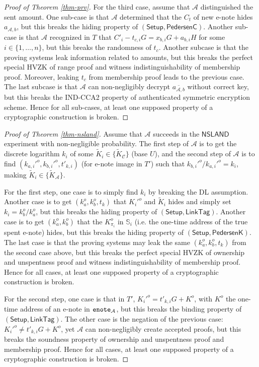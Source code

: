 \documentclass{article}
\begin{document}
\begin{proof}[Proof of Theorem \ref{thm-prv}]
For the third case, assume that $\mathcal{A}$ distinguished the sent amount. One sub-case is that $\mathcal{A}$ determined that the $C_t$ of new e-note hides $a_{\mathcal{A}, b}$, but this breaks the hiding property of $(\textsf{Setup}, \textsf{PedersenC})$. Another sub-case is that $\mathcal{A}$ recognized in $T$ that $C'_i - t_{c, i}G = x_{b,i}G + a_{b,i}H$ for some $i \in \{1, \ldots, n\}$, but this breaks the randomness of $t_c$. Another subcase is that the proving systems leak information related to amounts, but this breaks the perfect special HVZK of range proof and witness indistinguishability of membership proof. Moreover, leaking $t_c$ from membership proof leads to the previous case. The last subcase is that $\mathcal{A}$ can non-negligibly decrypt $\overline{a_{\mathcal{A},b}}$ without correct key, but this breaks the IND-CCA2 property of authenticated symmetric encryption scheme. Hence for all sub-cases, at least one supposed property of a cryptographic construction is broken.
\end{proof}
\begin{proof}[Proof of Theorem \ref{thm-nsland}]
Assume that $\mathcal{A}$ succeeds in the $\textsf{NSLAND}$ experiment with non-negligible probability. The first step of $\mathcal{A}$ is to get the discrete logarithm $k_i$ of some $\tilde{K}_i \in \{\tilde{K}_{\mathcal{C}}\}$ (base $U$), and the second step of $\mathcal{A}$ is to find $(k_{a,i}'^o, k_{b,i}'^o, t'_{k,i})$ (for e-note image in $T'$) such that $k_{b,i}'^o/k_{a,i}'^o = k_i$, making $\tilde{K}_i \in \{\tilde{K}_{\mathcal{A}}\}$.

For the first step, one case is to simply find $k_i$ by breaking the DL assumption. Another case is to get $(k_a^o, k_b^o, t_k)$ that $K_i'^o$ and $\tilde{K}_i$ hides and simply set $k_i = k_b^o / k_a^o$, but this breaks the hiding property of $(\textsf{Setup}, \textsf{LinkTag})$. Another case is to get $(k_a^o, k_b^o)$ that the $K_{\pi_i}^o$ in $\mathbb{S}_i$ (i.e. the one-time address of the true spent e-note) hides, but this breaks the hiding property of $(\textsf{Setup}, \textsf{PedersenK})$. The last case is that the proving systems may leak the same $(k_a^o, k_b^o, t_k)$ from the second case above, but this breaks the perfect special HVZK of ownership and unspentness proof and witness indistinguishability of membership proof. Hence for all cases, at least one supposed property of a cryptographic construction is broken.

For the second step, one case is that in $T'$, $K_i'^o = t'_{k,i} G+ K^o$, with $K^o$ the one-time address of an e-note in ${\tt enote}_{\mathcal{A}}$, but this breaks the binding property of $(\textsf{Setup}, \textsf{LinkTag})$. The other case is the negation of the previous case: $K_i'^o \ne t'_{k,i} G+ K^o$, yet $\mathcal{A}$ can non-negligibly create accepted proofs, but this breaks the soundness property of ownership and unspentness proof and membership proof. Hence for all cases, at least one supposed property of a cryptographic construction is broken.
\end{proof}
\end{document}

